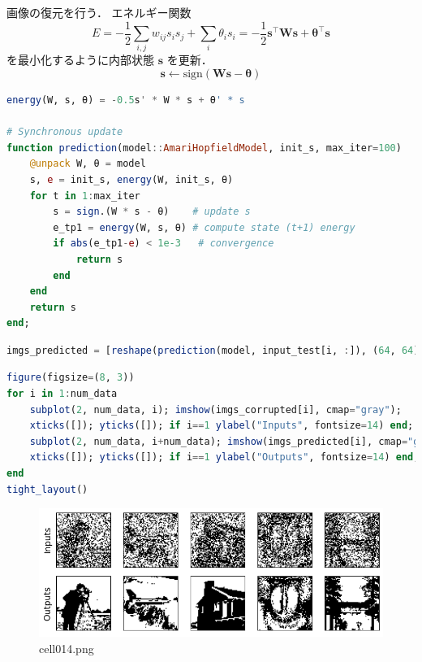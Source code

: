 画像の復元を行う．
エネルギー関数
\begin{equation}
E=-{\frac 12}\sum _{{i,j}}{w_{{ij}}{s_{i}}{s_{j}}}+\sum _{i}{\theta _{i}}{s_{i}}=-{\frac 12}\mathbf{s}^\top\mathbf{W}\mathbf{s}+\mathbf{\theta}^\top\mathbf{s}
\end{equation}
を最小化するように内部状態 $\mathbf{s}$ を更新．
\begin{equation}
\mathbf{s}\leftarrow \text{sign}\left(\mathbf{W}\mathbf{s}-\mathbf{\theta}\right)
\end{equation}
\begin{lstlisting}[language=julia]
energy(W, s, θ) = -0.5s' * W * s + θ' * s

# Synchronous update
function prediction(model::AmariHopfieldModel, init_s, max_iter=100)
    @unpack W, θ = model
    s, e = init_s, energy(W, init_s, θ)
    for t in 1:max_iter
        s = sign.(W * s - θ)    # update s
        e_tp1 = energy(W, s, θ) # compute state (t+1) energy
        if abs(e_tp1-e) < 1e-3   # convergence
            return s
        end
    end
    return s
end;
\end{lstlisting}
\begin{lstlisting}[language=julia]
imgs_predicted = [reshape(prediction(model, input_test[i, :]), (64, 64)) for i in 1:num_data];
\end{lstlisting}
\begin{lstlisting}[language=julia]
figure(figsize=(8, 3))
for i in 1:num_data
    subplot(2, num_data, i); imshow(imgs_corrupted[i], cmap="gray");  
    xticks([]); yticks([]); if i==1 ylabel("Inputs", fontsize=14) end;
    subplot(2, num_data, i+num_data); imshow(imgs_predicted[i], cmap="gray");  
    xticks([]); yticks([]); if i==1 ylabel("Outputs", fontsize=14) end;
end
tight_layout()
\end{lstlisting}
\begin{figure}[ht]
	\centering
	\includegraphics[scale=0.8, max width=\linewidth]{./fig/energy-based-model/hopfield-model/cell014.png}
	\caption{cell014.png}
	\label{cell014.png}
\end{figure}
